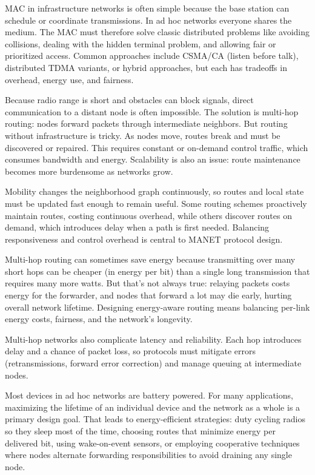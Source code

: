 MAC in infrastructure networks is often simple because the base station can schedule or coordinate transmissions. In ad hoc networks everyone shares the medium. The MAC must therefore solve classic distributed problems like avoiding collisions, dealing with the hidden terminal problem, and allowing fair or prioritized access. Common approaches include CSMA/CA (listen before talk), distributed TDMA variants, or hybrid approaches, but each has tradeoffs in overhead, energy use, and fairness.

Because radio range is short and obstacles can block signals, direct communication to a distant node is often impossible. The solution is multi-hop routing: nodes forward packets through intermediate neighbors. But routing without infrastructure is tricky. As nodes move, routes break and must be discovered or repaired. This requires constant or on-demand control traffic, which consumes bandwidth and energy. Scalability is also an issue: route maintenance becomes more burdensome as networks grow.

Mobility changes the neighborhood graph continuously, so routes and local state must be updated fast enough to remain useful. Some routing schemes proactively maintain routes, costing continuous overhead, while others discover routes on demand, which introduces delay when a path is first needed. Balancing responsiveness and control overhead is central to MANET protocol design.

Multi-hop routing can sometimes save energy because transmitting over many short hops can be cheaper (in energy per bit) than a single long transmission that requires many more watts. But that’s not always true: relaying packets costs energy for the forwarder, and nodes that forward a lot may die early, hurting overall network lifetime. Designing energy-aware routing means balancing per-link energy costs, fairness, and the network’s longevity.

Multi-hop networks also complicate latency and reliability. Each hop introduces delay and a chance of packet loss, so protocols must mitigate errors (retransmissions, forward error correction) and manage queuing at intermediate nodes.

Most devices in ad hoc networks are battery powered. For many applications, maximizing the lifetime of an individual device and the network as a whole is a primary design goal. That leads to energy-efficient strategies: duty cycling radios so they sleep most of the time, choosing routes that minimize energy per delivered bit, using wake-on-event sensors, or employing cooperative techniques where nodes alternate forwarding responsibilities to avoid draining any single node.

